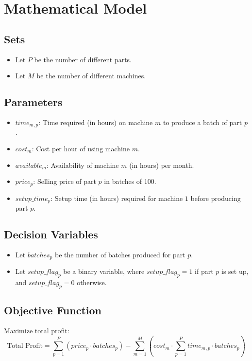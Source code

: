 \documentclass{article}
\begin{document}
\section*{Mathematical Model}

\subsection*{Sets}
\begin{itemize}
    \item Let \( P \) be the number of different parts.
    \item Let \( M \) be the number of different machines.
\end{itemize}

\subsection*{Parameters}
\begin{itemize}
    \item \( time_{m,p} \): Time required (in hours) on machine \( m \) to produce a batch of part \( p \).
    \item \( cost_{m} \): Cost per hour of using machine \( m \).
    \item \( available_{m} \): Availability of machine \( m \) (in hours) per month.
    \item \( price_{p} \): Selling price of part \( p \) in batches of 100.
    \item \( setup\_time_{p} \): Setup time (in hours) required for machine \( 1 \) before producing part \( p \).
\end{itemize}

\subsection*{Decision Variables}
\begin{itemize}
    \item Let \( batches_{p} \) be the number of batches produced for part \( p \).
    \item Let \( setup\_flag_{p} \) be a binary variable, where \( setup\_flag_{p} = 1 \) if part \( p \) is set up, and \( setup\_flag_{p} = 0 \) otherwise.
\end{itemize}

\subsection*{Objective Function}
Maximize total profit:
\[
\text{Total Profit} = \sum_{p=1}^{P} (price_{p} \cdot batches_{p}) - \sum_{m=1}^{M} \left( cost_{m} \cdot \sum_{p=1}^{P} time_{m,p} \cdot batches_{p} \right)
\]
\end{document}
